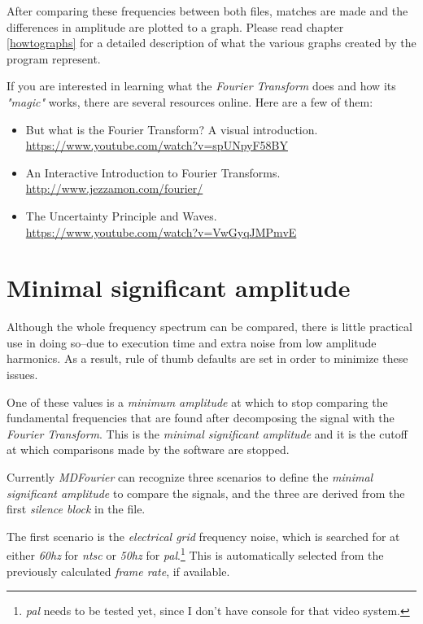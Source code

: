 \documentclass[10pt,a4paper]{report}
\newcommand{\ac}[1]{\textit{\acrshort{#1}}}
\newcommand{\hz}[1]{\textit{#1\acrshort{hz}}}
\begin{document}
After comparing these frequencies between both files, matches are made and the differences in amplitude are plotted to a graph. Please read chapter \ref{howtographs} for a detailed description of what the various graphs created by the program represent.

If you are interested in learning what the \textit{Fourier Transform} does and how its \textit{"magic"} works, there are several resources online. Here are a few of them:

\begin{itemize}
	\item But what is the Fourier Transform? A visual introduction.\\ \url{https://www.youtube.com/watch?v=spUNpyF58BY}
	\item An Interactive Introduction to Fourier Transforms.\\ \url{http://www.jezzamon.com/fourier/}
	\item The Uncertainty Principle and Waves.\\ \url{https://www.youtube.com/watch?v=VwGyqJMPmvE}
\end{itemize}

\section{Minimal significant amplitude}
\label{MinSigAmplitude}

Although the whole frequency spectrum can be compared, there is little practical use in doing so--due to execution time and extra noise from low amplitude harmonics. As a result, rule of thumb defaults are set in order to minimize these issues.

One of these values is a \textit{minimum amplitude} at which to stop comparing the fundamental frequencies that are found after decomposing the signal with the \textit{Fourier Transform}. This is the \textit{minimal significant amplitude} and it is the cutoff at which comparisons made by the software are stopped.

Currently \textit{MDFourier} can recognize three scenarios to define the \textit{minimal significant amplitude} to compare the signals, and the three are derived from the first \textit{silence block} in the file.

The first scenario is the \textit{electrical grid} frequency noise, which is searched for at either \hz{60} for \ac{ntsc} or \hz{50} for \ac{pal}.\footnote{\ac{pal} needs to be tested yet, since I don't have console for that video system.} This is automatically selected from the previously calculated \textit{frame rate}, if available.
\end{document}
